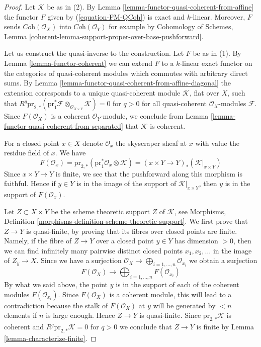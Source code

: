 \begin{proof}
Let $\mathcal{K}$ be as in (2). By
Lemma \ref{lemma-functor-quasi-coherent-from-affine}
the functor $F$ given by (\ref{equation-FM-QCoh}) is exact and $k$-linear.
Moreover, $F$ sends $\textit{Coh}(\mathcal{O}_X)$ into
$\textit{Coh}(\mathcal{O}_Y)$ for example by
Cohomology of Schemes, Lemma
\ref{coherent-lemma-support-proper-over-base-pushforward}.

\medskip\noindent
Let us construct the quasi-inverse to the construction. Let $F$ be
as in (1). By Lemma \ref{lemma-functor-coherent} we can extend $F$
to a $k$-linear exact functor on the
categories of quasi-coherent modules which commutes with arbitrary direct sums.
By Lemma \ref{lemma-functor-quasi-coherent-from-affine-diagonal}
the extension corresponds to a unique quasi-coherent module
$\mathcal{K}$, flat over $X$, such that
$R^q\text{pr}_{2, *}(\text{pr}_1^*\mathcal{F}
\otimes_{\mathcal{O}_{X \times Y}} \mathcal{K}) = 0$ for $q > 0$
for all quasi-coherent $\mathcal{O}_X$-modules $\mathcal{F}$.
Since $F(\mathcal{O}_X)$ is a coherent $\mathcal{O}_Y$-module, we
conclude from Lemma \ref{lemma-functor-quasi-coherent-from-separated}
that $\mathcal{K}$ is coherent.

\medskip\noindent
For a closed point $x \in X$ denote $\mathcal{O}_x$ the skyscraper sheaf
at $x$ with value the residue field of $x$. We have
$$
F(\mathcal{O}_x) =
\text{pr}_{2, *}(\text{pr}_1^*\mathcal{O}_x \otimes \mathcal{K}) =
(x \times Y \to Y)_*(\mathcal{K}|_{x \times Y})
$$
Since $x \times Y \to Y$ is finite, we see that the pushforward along
this morphism is faithful. Hence if $y \in Y$ is in the image of the
support of $\mathcal{K}|_{x \times Y}$, then $y$ is in the support of
$F(\mathcal{O}_x)$.

\medskip\noindent
Let $Z \subset X \times Y$ be the scheme theoretic support $Z$ of
$\mathcal{K}$, see
Morphisms, Definition \ref{morphisms-definition-scheme-theoretic-support}.
We first prove that $Z \to Y$ is quasi-finite, by proving that its fibres
over closed points are finite. Namely, if the fibre of $Z \to Y$ over a
closed point $y \in Y$ has dimension $> 0$, then we can find infinitely
many pairwise distinct closed points $x_1, x_2, \ldots$ in the image of
$Z_y \to X$. Since we have a surjection
$\mathcal{O}_X \to \bigoplus_{i = 1, \ldots, n} \mathcal{O}_{x_i}$
we obtain a surjection
$$
F(\mathcal{O}_X) \to \bigoplus\nolimits_{i = 1, \ldots, n} F(\mathcal{O}_{x_i})
$$
By what we said above, the point $y$ is in the support of each
of the coherent modules $F(\mathcal{O}_{x_i})$. Since $F(\mathcal{O}_X)$
is a coherent module, this will lead to a contradiction because
the stalk of $F(\mathcal{O}_X)$ at $y$ will be generated by $< n$ elements
if $n$ is large enough. Hence $Z \to Y$ is quasi-finite.
Since $\text{pr}_{2, *}\mathcal{K}$ is coherent and
$R^q\text{pr}_{2, *}\mathcal{K} = 0$ for $q > 0$ we conclude
that $Z \to Y$ is finite by Lemma \ref{lemma-characterize-finite}.
\end{proof}





